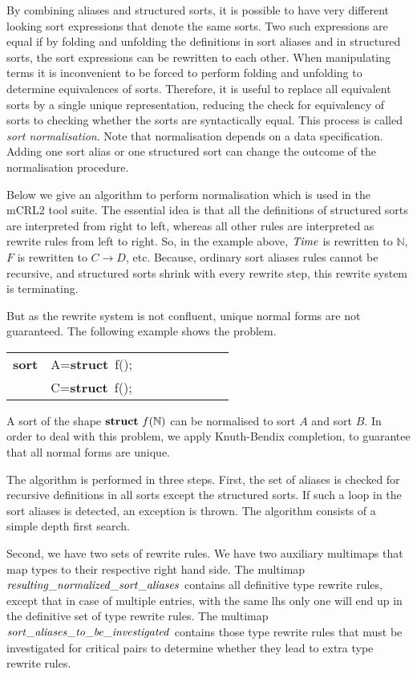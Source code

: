 \documentclass{article}
\makeatletter
\newcommand{\Nat}{\mathbb{N}}
\newenvironment{mcrl2}%
{\begin{trivlist}
\item\begin{tabular}{@{}>{\bf}p{2.3em}L@{\ }L@{\ }L@{\ }L@{\ }L@{\ }L@{\ }L@{\ }L}}%
{\end{tabular}\end{trivlist}}
\makeatother
\begin{document}
By combining aliases and structured sorts, 
it is possible to have very different looking sort expressions that denote
the same sorts. Two such expressions are equal if by folding and unfolding the definitions in
sort aliases and in structured sorts, 
the sort expressions can be rewritten to each other. 
When manipulating terms it is inconvenient
to be forced to perform folding and unfolding to determine equivalences of sorts. Therefore, it
is useful to replace all equivalent sorts by a single unique representation, reducing the check
for equivalency of sorts to checking whether the sorts are syntactically equal. This process
is called {\it sort normalisation}. Note that normalisation depends on a data specification.
Adding one sort alias or one structured sort can change the outcome of the 
normalisation procedure. 

Below we give an algorithm to perform normalisation which is used in the mCRL2 tool suite.
The essential idea is that all 
the definitions of structured sorts are interpreted from right to left, whereas all other 
rules are interpreted as rewrite rules from left to right. So, in the example above,
${\it Time}$ is rewritten to $\Nat$, $F$ is rewritten to $C\rightarrow D$, etc. Because,
ordinary sort aliases rules cannot be recursive, and structured sorts shrink with every
rewrite step, this rewrite system is terminating.

But as the rewrite system is not confluent, unique normal forms are not guaranteed. 
The following example shows the problem.
\begin{mcrl2}
sort & A={\bf struct}~f(\Nat);\\
     & C={\bf struct}~f(\Nat);
\end{mcrl2}
A sort of the shape ${\bf struct}~f(\Nat)$ can be normalised to sort $A$ and sort $B$. 
In order to deal with this problem, we apply Knuth-Bendix completion, to guarantee that
all normal forms are unique.

The algorithm is performed in three steps.
First, the set of aliases is checked for recursive definitions
in all sorts except the structured sorts. If such a loop in the sort aliases is
detected, an exception is thrown. The algorithm consists of
a simple depth first search.
 
 
Second, we have two sets of rewrite rules. We have two auxiliary multimaps that map
types to their respective right hand side. The multimap
${\it resulting\_normalized\_sort\_aliases}$ contains all definitive type rewrite rules,
except that in case of multiple entries, with the same lhs only one will end up in the
definitive set of type rewrite rules. The multimap
$\it sort\_aliases\_to\_be\_investigated$ contains those type rewrite rules that 
must be investigated for critical pairs to determine whether they lead to extra
type rewrite rules. 
\end{document}

